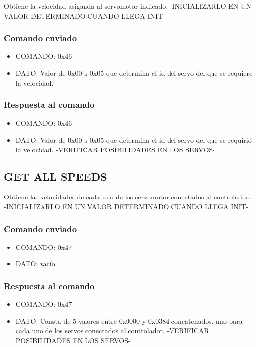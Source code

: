 \documentclass[a4paper,10pt]{article}
\begin{document}
Obtiene la velocidad asiganda al servomotor indicado. -INICIALIZARLO EN UN VALOR DETERMINADO CUANDO LLEGA INIT-

\subsubsection*{Comando enviado}

\begin{itemize}
	\item{COMANDO:} 0x46
	\item{DATO:} Valor de 0x00 a 0x05 que determina el id del servo del que se requiere la velocidad.
\end{itemize}

\subsubsection*{Respuesta al comando}

\begin{itemize}
	\item{COMANDO:} 0x46
	\item{DATO:} Valor de 0x00 a 0x05 que determina el id del servo del que se requiri\'o la velocidad.
	-VERIFICAR POSIBILIDADES EN LOS SERVOS-
\end{itemize}

\subsection{GET ALL SPEEDS}
\label{get_all_speeds}

Obtiene las velocidades de cada uno de los servomotor conectados al controlador. -INICIALIZARLO EN UN VALOR DETERMINADO CUANDO LLEGA INIT-

\subsubsection*{Comando enviado}

\begin{itemize}
	\item{COMANDO:} 0x47
	\item{DATO:} vac\'io
\end{itemize}

\subsubsection*{Respuesta al comando}

\begin{itemize}
	\item{COMANDO:} 0x47
	\item{DATO:} Consta de 5 valores entre 0x0000 y 0x0384 concatenados, uno para cada uno de los servos conectados al controlador.
	-VERIFICAR POSIBILIDADES EN LOS SERVOS-
\end{itemize}
\end{document}
